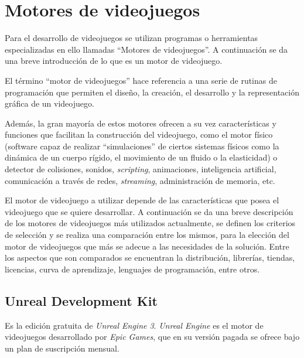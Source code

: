 \section{Motores de videojuegos}


Para el desarrollo de videojuegos se utilizan programas o herramientas
especializadas en ello llamadas \enquote{Motores de videojuegos}. A continuación
se da una breve introducción de lo que es un motor de videojuego.

El término \enquote{motor de videojuegos} hace referencia a una serie de rutinas
de programación que permiten el diseño, la creación, el desarrollo y la
representación gráfica de un videojuego\cite{videojuego:telechea}.

Además, la gran mayoría de estos motores ofrecen a su vez características y
funciones que facilitan la construcción del videojuego, como el motor físico
(software capaz de realizar \enquote{simulaciones} de ciertos sistemas físicos
como la dinámica de un cuerpo rígido, el movimiento de un fluido o la
elasticidad) o detector de colisiones, sonidos, \textit{scripting}, animaciones,
inteligencia artificial, comunicación a través de redes, \textit{streaming},
administración de memoria, etc\cite{videojuego:telechea}.

El motor de videojuego a utilizar depende de las características que posea el
videojuego que se quiere desarrollar. A continuación
se da una breve descripción de los motores de videojuegos más utilizados actualmente, se
definen los criterios de selección y se realiza una comparación entre los
mismos, para la elección del motor de videojuegos que más se adecue a las necesidades de la 
solución. Entre los aspectos que son comparados se encuentran la distribución, librerías, 
tiendas, licencias, curva de aprendizaje, lenguajes de programación, entre otros.


\subsection{Unreal Development Kit}

Es la edición gratuita de \textit{Unreal Engine 3}. \textit{Unreal Engine} es el 
motor de videojuegos desarrollado por \textit{Epic Games}, que en su versión pagada se 
ofrece bajo un plan de suscripción mensual\cite{unrealengine}.

